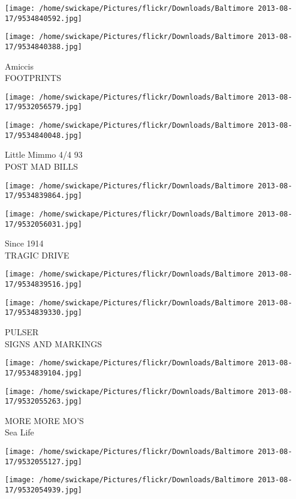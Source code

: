 \documentclass[10pt,letterpaper]{article}
\begin{document}
\texttt{[image: /home/swickape/Pictures/flickr/Downloads/Baltimore 2013-08-17/9534840592.jpg]}

\vspace{0.25in}
\texttt{[image: /home/swickape/Pictures/flickr/Downloads/Baltimore 2013-08-17/9534840388.jpg]}

Amiccis\\
FOOTPRINTS
\pagebreak

\texttt{[image: /home/swickape/Pictures/flickr/Downloads/Baltimore 2013-08-17/9532056579.jpg]}

\vspace{0.25in}
\texttt{[image: /home/swickape/Pictures/flickr/Downloads/Baltimore 2013-08-17/9534840048.jpg]}

Little Mimmo 4/4 93\\
POST MAD BILLS
\pagebreak

\texttt{[image: /home/swickape/Pictures/flickr/Downloads/Baltimore 2013-08-17/9534839864.jpg]}

\vspace{0.25in}
\texttt{[image: /home/swickape/Pictures/flickr/Downloads/Baltimore 2013-08-17/9532056031.jpg]}

Since 1914\\
TRAGIC DRIVE
\pagebreak

\texttt{[image: /home/swickape/Pictures/flickr/Downloads/Baltimore 2013-08-17/9534839516.jpg]}

\vspace{0.25in}
\texttt{[image: /home/swickape/Pictures/flickr/Downloads/Baltimore 2013-08-17/9534839330.jpg]}

PULSER\\
SIGNS AND MARKINGS
\pagebreak

\texttt{[image: /home/swickape/Pictures/flickr/Downloads/Baltimore 2013-08-17/9534839104.jpg]}

\vspace{0.25in}
\texttt{[image: /home/swickape/Pictures/flickr/Downloads/Baltimore 2013-08-17/9532055263.jpg]}

MORE MORE MO'S\\
Sea Life
\pagebreak

\texttt{[image: /home/swickape/Pictures/flickr/Downloads/Baltimore 2013-08-17/9532055127.jpg]}

\vspace{0.25in}
\texttt{[image: /home/swickape/Pictures/flickr/Downloads/Baltimore 2013-08-17/9532054939.jpg]}
\end{document}
